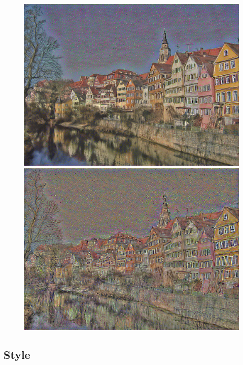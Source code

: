 \documentclass{article}
\begin{document}
\begin{figure}[htp]
    \begin{minipage}{0.3\linewidth}
    \includegraphics[width=\textwidth]{img/content/block4_conv1}
    \end{minipage}
    \begin{minipage}{0.3\linewidth}
    \includegraphics[width=\textwidth]{img/content/block5_conv1}
    \end{minipage}

\end{figure}



\subsection{Style}
\end{document}

